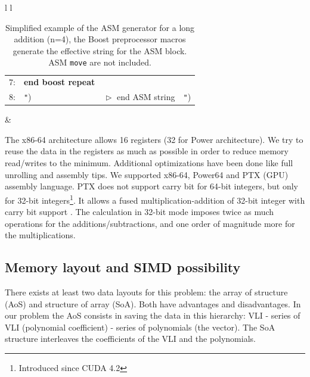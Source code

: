 \documentclass[oribibl]{llncs2e/llncs}
\begin{document}
\begin{table}[h]
\begin{center}
\begin{tabular}{l l}
\begin{tabular}{l l l l }
                               \tiny{7:} &  \textbf{end boost repeat} &  &   \\                            
                               \tiny{8:} &  \texttt{"})  &  $\vartriangleright$ end ASM string & \texttt{"})\\
                          \end{tabular} &  \\ \hline
		 \end{tabular} 
		 \caption{Simplified  example of the ASM generator for a long addition (n=4), the Boost preprocessor macros generate the effective string for the ASM block. ASM \texttt{move} are not included. \label{ASMGENERATOR}  }
	\end{center}
\end{table} 

The x86-64 architecture allows 16 registers (32 for Power architecture). We try to reuse the data in the registers as much as possible in order to reduce memory read/writes to the minimum.  Additional optimizations have been done like full unrolling and assembly tips. We  supported  x86-64, Power64 and PTX (GPU) assembly language.
 PTX does not support carry bit for 64-bit integers, but only for 32-bit integers\footnote{Introduced since CUDA 4.2}.  
It allows a fused multiplication-addition of 32-bit integer  with carry bit support \cite{CUDAasm}. 
The calculation in 32-bit mode imposes twice as much operations for the additions/subtractions, and one order of magnitude more for the multiplications. 

\subsection{Memory layout and SIMD possibility}

There exists at least two data layouts for this problem: the array of structure (AoS) and structure of array (SoA). Both have  advantages and disadvantages. In our problem the AoS consists in saving the data in this hierarchy: VLI - series of VLI (polynomial coefficient) - series of polynomials (the vector). The SoA structure interleaves the coefficients of the VLI and the polynomials.
\end{document}
